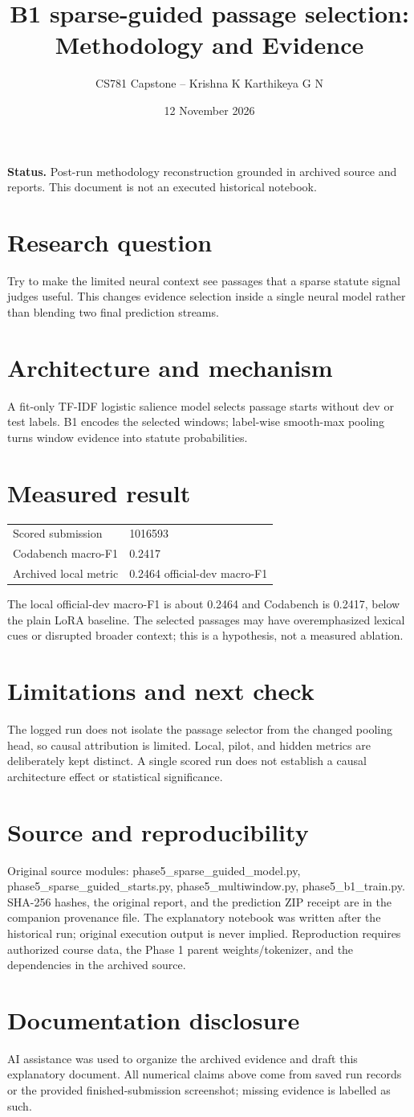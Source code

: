 \documentclass[11pt,a4paper]{article}
\title{B1 sparse-guided passage selection: Methodology and Evidence}
\author{CS781 Capstone -- Krishna K Karthikeya G N}
\date{12 November 2026}
\begin{document}
\maketitle
\noindent\textbf{Status.} Post-run methodology reconstruction grounded in archived source and reports. This document is not an executed historical notebook.\par
\section*{Research question}
Try to make the limited neural context see passages that a sparse statute signal judges useful. This changes evidence selection inside a single neural model rather than blending two final prediction streams.
\section*{Architecture and mechanism}
A fit-only TF-IDF logistic salience model selects passage starts without dev or test labels. B1 encodes the selected windows; label-wise smooth-max pooling turns window evidence into statute probabilities.
\section*{Measured result}
\begin{center}\begin{tabular}{ll}Scored submission & 1016593\\
Codabench macro-F1 & 0.2417\\
Archived local metric & 0.2464 official-dev macro-F1\end{tabular}\end{center}
The local official-dev macro-F1 is about 0.2464 and Codabench is 0.2417, below the plain LoRA baseline. The selected passages may have overemphasized lexical cues or disrupted broader context; this is a hypothesis, not a measured ablation.
\section*{Limitations and next check}
The logged run does not isolate the passage selector from the changed pooling head, so causal attribution is limited. Local, pilot, and hidden metrics are deliberately kept distinct. A single scored run does not establish a causal architecture effect or statistical significance.
\section*{Source and reproducibility}
Original source modules: phase5\_sparse\_guided\_model.py, phase5\_sparse\_guided\_starts.py, phase5\_multiwindow.py, phase5\_b1\_train.py. SHA-256 hashes, the original report, and the prediction ZIP receipt are in the companion provenance file. The explanatory notebook was written after the historical run; original execution output is never implied. Reproduction requires authorized course data, the Phase 1 parent weights/tokenizer, and the dependencies in the archived source.
\section*{Documentation disclosure}
AI assistance was used to organize the archived evidence and draft this explanatory document. All numerical claims above come from saved run records or the provided finished-submission screenshot; missing evidence is labelled as such.
\end{document}
